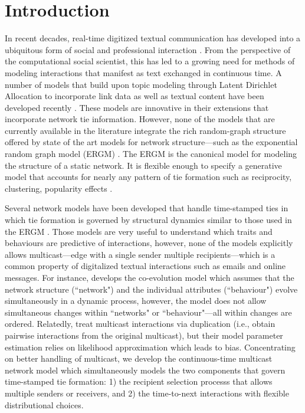 \documentclass[12pt]{article}
\begin{document}
\section{Introduction}\label{sec:intro}
In recent decades, real-time digitized textual communication has developed into a ubiquitous form of social and professional interaction \citep{kanungo2008modeling, szostek2011dealing, burgess2004email, pew2016}. From the perspective of the computational social scientist, this has led to a growing need for methods of modeling interactions that manifest as text exchanged in continuous time. A number of models that build upon topic modeling through Latent Dirichlet Allocation \citep{Blei2003} to incorporate link data as well as textual content have been developed recently \citep{mccallum2005author,lim2013twitter,Krafft2012}. These models are innovative in their extensions that incorporate network tie information. However, none of the models that are currently available in the literature integrate the rich random-graph structure offered by state of the art models for network structure---such as the exponential random graph model (ERGM) \citep{robins2007introduction,chatterjee2013estimating,hunter2008ergm}. The ERGM is the canonical model for modeling the structure of a static network. It is flexible enough to specify a generative model that accounts for nearly any pattern of tie formation such as reciprocity, clustering, popularity effects \citep{desmarais2017statistical}. 

Several network models have been developed that handle time-stamped ties in which tie formation is governed by structural dynamics similar to those used in the ERGM \citep{Butts2008,Vu2011,snijders1996stochastic}. Those models are very useful to understand which traits and behaviours are predictive of interactions, however, none of the models explicitly allows multicast---edge with a single sender multiple recipients---which is a common property of digitalized textual interactions such as emails and online messages. For instance, \cite{snijders2007modeling} develops the co-evolution model which assumes that the network structure (``network") and the individual attributes (``behaviour") evolve simultaneously in a dynamic process, however, the model does not allow simultaneous changes within ``networks" or ``behaviour"---all within changes are ordered.
Relatedly, \cite{PerryWolfe2012} treat multicast interactions via duplication (i.e., obtain pairwise interactions from the original multicast), but their model parameter estimation relies on likelihood approximation which leads to bias. Concentrating on better handling of multicast, we develop the continuous-time multicast network model which simultaneously models the two components that govern time-stamped tie formation: 1) the recipient selection processs that allows multiple senders or receivers, and 2) the time-to-next interactions with flexible distributional choices.
\end{document}
